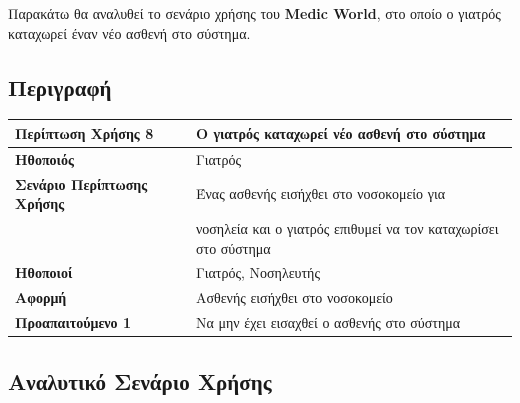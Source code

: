\documentclass{article}
\newcommand\T{\rule{0pt}{2.6ex}}       %
\newcommand\B{\rule[-1.2ex]{0pt}{0pt}}
\begin{document}
Παρακάτω θα αναλυθεί το σενάριο χρήσης του \textbf{Medic World}, στο οποίο ο γιατρός καταχωρεί έναν νέο ασθενή στο σύστημα.

\subsection{Περιγραφή}

\begin{center}
     \begin{tabular}{|l|l|}
     \hline
      \textbf{Περίπτωση Χρήσης 8} & Ο γιατρός καταχωρεί νέο ασθενή στο σύστημα \T\B \\ 
      \hline
      \textbf{Ηθοποιός} & Γιατρός \T\B \\
      \hline
      \textbf{Σενάριο Περίπτωσης Χρήσης} & Ένας ασθενής εισήχθει στο νοσοκομείο για   \T \\& νοσηλεία και ο γιατρός επιθυμεί να τον καταχωρίσει στο σύστημα \\
      \hline
      \textbf{Ηθοποιοί} & Γιατρός, Νοσηλευτής \T\B \\
      \hline
      \textbf{Αφορμή} &  Ασθενής εισήχθει στο νοσοκομείο\T\B \\
      \hline
      \textbf{Προαπαιτούμενο 1} & Να μην έχει εισαχθεί ο ασθενής στο σύστημα \T\B \\
      \hline
     \end{tabular}
 \end{center}
 
 \newpage
 
 \subsection{Αναλυτικό Σενάριο Χρήσης}
 
\end{document}
